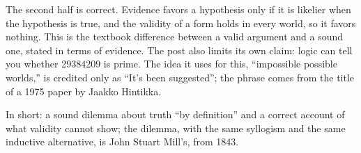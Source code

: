 \begin{afterword}
The second half is correct. Evidence favors a hypothesis only if it is likelier when the hypothesis is true, and the validity of a form holds in every world, so it favors nothing. This is the textbook difference between a valid argument and a sound one, stated in terms of evidence. The post also limits its own claim: logic can tell you whether 29384209 is prime. The idea it uses for this, ``impossible possible worlds,'' is credited only as ``It's been suggested''; the phrase comes from the title of a 1975 paper by Jaakko Hintikka.

In short: a sound dilemma about truth ``by definition'' and a correct account of what validity cannot show; the dilemma, with the same syllogism and the same inductive alternative, is John Stuart Mill's, from 1843.
\end{afterword}

